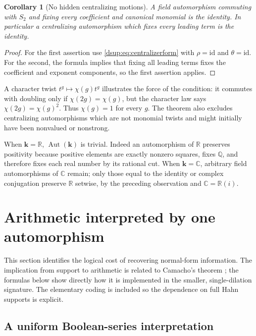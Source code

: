 \documentclass[11pt,oneside]{article}
\numberwithin{equation}{section}
\newtheorem{corollary}[theorem]{Corollary}
\theoremstyle{definition}
\theoremstyle{remark}
\newcommand{\R}{\mathbb R}
\newcommand{\C}{\mathbb C}
\newcommand{\Q}{\mathbb Q}
\newcommand{\kk}{\mathbf k}
\newcommand{\id}{\mathrm{id}}
\newcommand{\Aut}{\operatorname{Aut}}
\begin{document}
\begin{corollary}[No hidden centralizing motions]\label{dsup:cor:nohidden}
A field automorphism commuting with $S_2$ and fixing every coefficient
and canonical monomial is the identity. In particular a centralizing
automorphism which fixes every leading term is the identity.
\end{corollary}
\begin{proof}
For the first assertion use \eqref{dsup:eq:centralizerform} with
$\rho=\id$ and $\theta=\id$. For the second, the formula implies that
fixing all leading terms fixes the coefficient and exponent components,
so the first assertion applies.
\end{proof}

A character twist $t^g\mapsto\chi(g)t^g$ illustrates the force of the
condition: it commutes with doubling only if
$\chi(2g)=\chi(g)$, but the character law says
$\chi(2g)=\chi(g)^2$. Thus $\chi(g)=1$ for every $g$.
The theorem also excludes centralizing automorphisms which are not
monomial twists and might initially have been nonvalued or nonstrong.

When $\kk=\R$, $\Aut(\kk)$ is trivial. Indeed an automorphism of $\R$
preserves positivity because positive elements are exactly nonzero
squares, fixes $\Q$, and therefore fixes each real number by its rational
cut. When $\kk=\C$, arbitrary field automorphisms of $\C$ remain; only
those equal to the identity or complex conjugation preserve $\R$ setwise,
by the preceding observation and $\C=\R(i)$.

\section{Arithmetic interpreted by one automorphism}\label{dsup:sec:logic}

This section identifies the logical cost of recovering normal-form
information. The implication from support to arithmetic is related to
Camacho's theorem \cite{Camacho}; the formulas below show directly how it
is implemented in the smaller, single-dilation signature. The elementary
coding is included so the dependence on full Hahn supports is explicit.

\subsection{A uniform Boolean-series interpretation}
\end{document}
